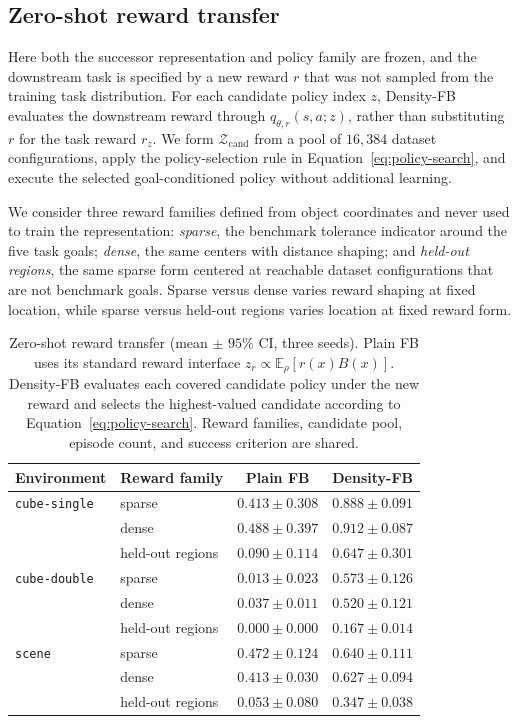 \documentclass[11pt]{article}
\newcommand{\DensityFB}{Density-FB}
\begin{document}
\subsection{Zero-shot reward transfer}

Here both the successor representation and policy family are frozen, and the downstream task is specified by a new reward $r$ that was not sampled from the training task distribution. For each candidate policy index $z$, Density-FB evaluates the downstream reward through $q_{\theta,r}(s,a;z)$, rather than substituting $r$ for the task reward $r_z$. We form $\mathcal Z_{\mathrm{cand}}$ from a pool of $16{,}384$ dataset configurations, apply the policy-selection rule in Equation~\eqref{eq:policy-search}, and execute the selected goal-conditioned policy without additional learning.

We consider three reward families defined from object coordinates and never used to train the representation: \emph{sparse}, the benchmark tolerance indicator around the five task goals; \emph{dense}, the same centers with distance shaping; and \emph{held-out regions}, the same sparse form centered at reachable dataset configurations that are not benchmark goals. Sparse versus dense varies reward shaping at fixed location, while sparse versus held-out regions varies location at fixed reward form.

\begin{table}[h]
\centering
\small
\setlength{\tabcolsep}{5pt}
\begin{tabular}{llcc}
\toprule
Environment & Reward family & Plain FB & \DensityFB{} \\
\midrule
\texttt{cube-single} & sparse & $0.413 \pm 0.308$ & $\mathbf{0.888 \pm 0.091}$ \\
& dense & $0.488 \pm 0.397$ & $\mathbf{0.912 \pm 0.087}$ \\
& held-out regions & $0.090 \pm 0.114$ & $\mathbf{0.647 \pm 0.301}$ \\
\midrule
\texttt{cube-double} & sparse & $0.013 \pm 0.023$ & $\mathbf{0.573 \pm 0.126}$ \\
& dense & $0.037 \pm 0.011$ & $\mathbf{0.520 \pm 0.121}$ \\
& held-out regions & $0.000 \pm 0.000$ & $\mathbf{0.167 \pm 0.014}$ \\
\midrule
\texttt{scene} & sparse & $0.472 \pm 0.124$ & $\mathbf{0.640 \pm 0.111}$ \\
& dense & $0.413 \pm 0.030$ & $\mathbf{0.627 \pm 0.094}$ \\
& held-out regions & $0.053 \pm 0.080$ & $\mathbf{0.347 \pm 0.038}$ \\
\bottomrule
\end{tabular}
\caption{Zero-shot reward transfer (mean $\pm$ $95\%$ CI, three seeds). Plain FB uses its standard reward interface $z_r\propto\mathbb E_\rho[r(x)B(x)]$. Density-FB evaluates each covered candidate policy under the new reward and selects the highest-valued candidate according to Equation~\eqref{eq:policy-search}. Reward families, candidate pool, episode count, and success criterion are shared.}
\label{tab:zeroshot}
\end{table}
\end{document}
